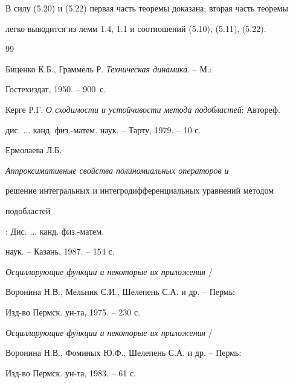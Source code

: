 В силу (5.20) и (5.22) первая часть теоремы доказана; вторая часть теоремы


легко выводится из лемм 1.4, 1.1 и соотношений (5.10), (5.11), (5.22).








\begin{thebibliography}{99}







Биценко К.Б., Граммель Р. {\em Техническая динамика}. -- М.:


Гостехиздат, 1950. -- 900~с.







Керге Р.Г. {\em О сходимости и устойчивости метода подобластей}: Автореф.


дис. $\dotsc$ канд. физ.-матем. наук. -- Тарту, 1979. -- 10 с.







Ермолаева Л.Б. {\em Аппроксимативные свойства полиномиальных операторов и


решение интегральных и интегродифференциальных уравнений методом


подобластей}: Дис. $\dotsc$ канд. физ.-матем.


наук. -- Казань, 1987. -- 154 с.







{\em Осциллирующие функции и некоторые их приложения} /


Воронина Н.В., Мельник С.И., Шелепень С.А. и др. -- Пермь:


Изд-во Пермск. ун-та, 1975. -- 230 с.







{\em Осциллирующие функции и некоторые их приложения} /


Воронина Н.В., Фоминых Ю.Ф., Шелепень С.А. и др. -- Пермь:


Изд-во Пермск. ун-та, 1983. -- 61 с.








\end{thebibliography}
